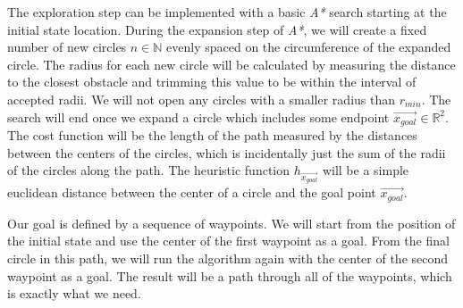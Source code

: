 The exploration step can be implemented with a basic \textit{A*} search starting at the initial state location. During the expansion step of \textit{A*}, we will create a fixed number of new circles $n\in \mathbb{N}$ evenly spaced on the circumference of the expanded circle. The radius for each new circle will be calculated by measuring the distance to the closest obstacle and trimming this value to be within the interval of accepted radii. We will not open any circles with a smaller radius than $r_{min}$. The search will end once we expand a circle which includes some endpoint $\vec{x_{goal}}\in \mathbb{R}^2$. The cost function will be the length of the path measured by the distances between the centers of the circles, which is incidentally just the sum of the radii of the circles along the path. The heuristic function $h_{\vec{x_{goal}}}$ will be a simple euclidean distance between the center of a circle and the goal point $\vec{x_{goal}}$.

Our goal is defined by a sequence of waypoints. We will start from the position of the initial state and use the center of the first waypoint as a goal. From the final circle in this path, we will run the algorithm again with the center of the second waypoint as a goal. The result will be a path through all of the waypoints, which is exactly what we need.


